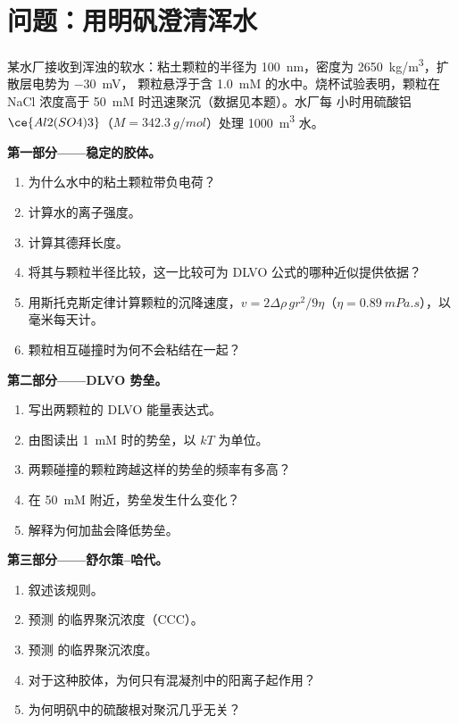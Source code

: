 \clearpage
\enlargethispage{3\baselineskip}
\section{问题：用明矾澄清浑水}

\begin{problem}
\label{pb:b3:colloids:1}
某水厂接收到浑浊的软水：粘土颗粒的半径为
\qty{100}{nm}，密度为 \qty{2650}{kg/m^3}，扩散层电势为 \qty{-30}{mV}，
颗粒悬浮于含 \qty{1.0}{mM}  的水中。烧杯试验表明，颗粒在
NaCl 浓度高于 \qty{50}{mM} 时迅速聚沉（数据见本题）。水厂每
小时用硫酸铝 $\ce{Al2(SO4)3}$（$M = \qty{342.3}{g/mol}$）处理 \qty{1000}{m^3} 水。

\medskip\noindent\textbf{第一部分——稳定的胶体。}
\begin{enumerate}
  \item 为什么水中的粘土颗粒带负电荷？
  \item 计算水的离子强度。
  \item 计算其德拜长度。
  \item 将其与颗粒半径比较，这一比较可为 DLVO
        公式的哪种近似提供依据？
  \item 用斯托克斯定律计算颗粒的沉降速度，$v =
        2\Delta\rho\,gr^2/9\eta$（$\eta = \qty{0.89}{mPa.s}$），以毫米每天计。
  \item 颗粒相互碰撞时为何不会粘结在一起？
\end{enumerate}

\medskip\noindent\textbf{第二部分——DLVO 势垒。}
\begin{enumerate}[resume]
  \item 写出两颗粒的 DLVO 能量表达式。
  \item 由图读出 \qty{1}{mM} 时的势垒，以 $kT$ 为单位。
  \item 两颗碰撞的颗粒跨越这样的势垒的频率有多高？
  \item 在 \qty{50}{mM} 附近，势垒发生什么变化？
  \item 解释为何加盐会降低势垒。
\end{enumerate}

\medskip\noindent\textbf{第三部分——舒尔策–哈代。}
\begin{enumerate}[resume]
  \item 叙述该规则。
  \item 预测  的临界聚沉浓度（CCC）。
  \item 预测  的临界聚沉浓度。
  \item 对于这种胶体，为何只有混凝剂中的阳离子起作用？
  \item 为何明矾中的硫酸根对聚沉几乎无关？
\end{enumerate}


\end{problem}
